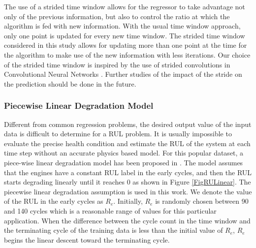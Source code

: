 \documentclass[preprint,12pt]{elsarticle}%
\begin{document}
\pagebreak

The use of a strided time window allows for the regressor to take advantage
not only of the previous information, but also to control the ratio at which
the algorithm is fed with new information. With the usual time window
approach, only one point is updated for every new time window. The strided
time window considered in this study allows for updating more than one point
at the time for the algorithm to make use of the new information with less iterations. 
Our choice of the strided time window is inspired by the use of strided convolutions in 
Convolutional Neural Networks \cite{Kong2017}. Further studies of the impact of 
the stride on the prediction should be done in the future.

\subsubsection{Piecewise Linear Degradation Model}

Different from common regression problems, the desired output value of the
input data is difficult to determine for a RUL problem. It is usually
impossible to evaluate the precise health condition and estimate the RUL of
the system at each time step without an accurate physics based model. For this
popular dataset, a piece-wise linear degradation model has been proposed in
\cite{Ramasso2014}. The model assumes that the engines have a constant RUL
label in the early cycles, and then the RUL starts degrading linearly until it
reaches 0 as shown in Figure \ref{FigRULinear}. The piecewise linear
degradation assumption is used in this work. We denote the value of the RUL in
the early cycles as $R_{e}$. Initially,  $R_{e}$ is randomly chosen between 90 and 140 
cycles which is a reasonable range of values for this particular application. When the difference between the cycle count in the time window and the terminating cycle 
of the training data is less than the initial value of $R_{e}$, $R_{e}$ begins the linear 
descent toward the terminating cycle.
\end{document}
